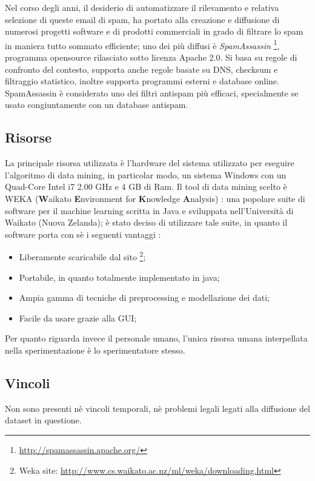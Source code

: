 Nel corso degli anni, il desiderio di automatizzare il rilevamento e relativa selezione di queste email di spam, ha portato alla creazione e diffusione di numerosi progetti software e di prodotti commerciali in grado di filtrare lo spam in maniera tutto sommato efficiente; uno dei più diffusi è \textit{SpamAssassin} \footnote{\url{http://spamassassin.apache.org/}}, programma opensource rilasciato sotto licenza Apache 2.0. Si basa su regole di confronto del contesto, supporta anche regole basate su DNS, checksum e filtraggio statistico, inoltre supporta programmi esterni e database online.
SpamAssassin è considerato uno dei filtri antispam più efficaci, specialmente se usato congiuntamente con un database antispam.\cite{wiki:SpamAssassin}

\subsection{Risorse}
La principale risorsa utilizzata è l'hardware del sistema utilizzato per eseguire l'algoritmo di data mining, in particolar modo, un sistema Windows con un Quad-Core Intel i7 2.00 GHz e 4 GB di Ram.
Il tool di data mining scelto è WEKA (\textbf{W}aikato \textbf{E}nvironment for \textbf{K}nowledge \textbf{A}nalysis) \cite{WEKA}:
una popolare suite di software per il machine learning scritta in Java e sviluppata nell'Università di Waikato (Nuova Zelanda); è stato deciso di utilizzare tale suite, in quanto il software porta con sè i seguenti vantaggi :
\begin{itemize}
	\item Liberamente scaricabile dal sito \footnote{Weka site: \url{http://www.cs.waikato.ac.nz/ml/weka/downloading.html}};
    \item Portabile, in quanto totalmente implementato in java;
    \item Ampia gamma di tecniche di preprocessing e modellazione dei dati;
    \item Facile da usare grazie alla GUI;
\end{itemize}

Per quanto riguarda invece il personale umano, l'unica risorsa umana interpellata nella sperimentazione è lo sperimentatore stesso.

\subsection{Vincoli}
	Non sono presenti nè vincoli temporali, nè problemi legali legati alla diffusione del dataset in questione.

